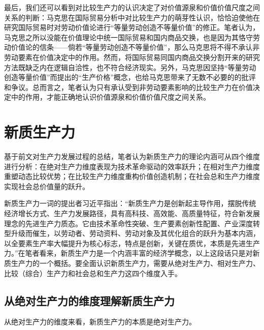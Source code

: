 最后，我们还可以看到对比较生产力的认识决定了对价值源泉和价值价值尺度之间关系的判断：马克思在国际贸易分析中对比较生产力的萌芽性认识，恰恰迫使他在研究国际贸易时对劳动价值论进行“等量劳动创造不等量价值”的修正。笔者认为，马克思之所以没能在价值理论中统一国际贸易和国内商品交换，也是因为其恪守劳动价值论的信条——倘若“等量劳动创造不等量价值”，那么马克思将不得不承认非劳动要素在价值决定中的作用。然而，将国际贸易同国内商品交换分割开来的研究方法既缺乏内在逻辑自洽性，也不符合经济现实。另外，马克思因坚持“等量劳动创造等量价值”而提出的“生产价格”概念，也给马克思带来了无数不必要的的批评和争议。总而言之，笔者认为只有承认受到非劳动要素影响的比较生产力在价值决定中的作用，才能正确地认识价值源泉和价值价值尺度之间关系。

\section{新质生产力}

基于前文对生产力发展过程的总结，笔者认为新质生产力的理论内涵可从四个维度进行分析：在绝对生产力维度表现为技术革命驱动的效率跃升；在相对生产力维度重塑动态比较优势；在比较生产力维度重构价值创造机制；在社会总和生产力维度实现社会总价值量的跃升。

新质生产力一词的提出者习近平指出：“新质生产力是创新起主导作用，摆脱传统经济增长方式、生产力发展路径，具有高科技、高效能、高质量特征，符合新发展理念的先进生产力质态。它由技术革命性突破、生产要素创新性配置、产业深度转型升级而催生，以劳动者、劳动资料、劳动对象及其优化组合的跃升为基本内涵，以全要素生产率大幅提升为核心标志，特点是创新，关键在质优，本质是先进生产力。”\cite[515-516]{XiJinPingXiJinPingJingJiWenXuanDiYiJuan2025}在笔者看来，新质生产力是一个内涵丰富的经济学概念，以上这段话只是对新质生产力的一个概括。要全面认识新质生产力，需要从绝对生产力、相对生产力、比较（综合）生产力和社会总和生产力这四个维度入手。

\subsection{从绝对生产力的维度理解新质生产力}

从绝对生产力的维度来看，新质生产力的本质是绝对生产力。

